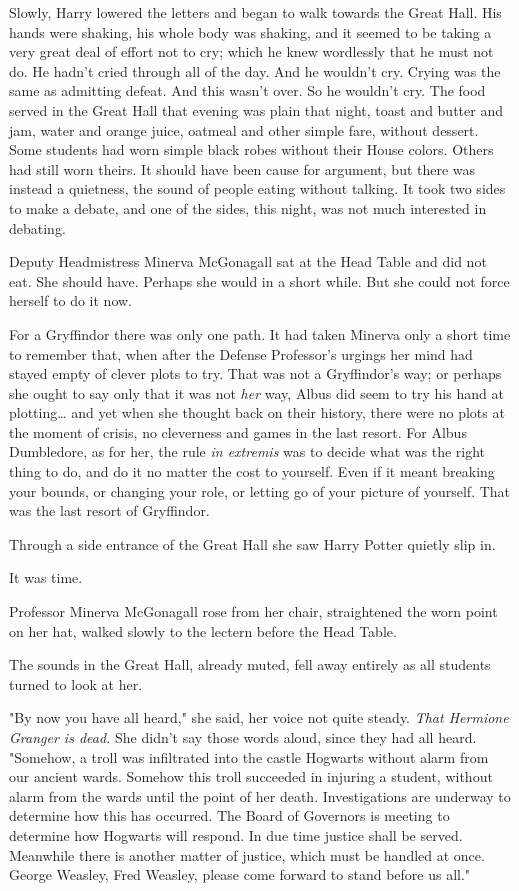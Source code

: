 Slowly, Harry lowered the letters and began to walk towards the Great Hall. His 
hands were shaking, his whole body was shaking, and it seemed to be taking a 
very great deal of effort not to cry; which he knew wordlessly that he must not 
do. He hadn't cried through all of the day. And he wouldn't cry. Crying was the 
same as admitting defeat. And this wasn't over. So he wouldn't cry.
\sbreak
The food served in the Great Hall that evening was plain that night, toast and 
butter and jam, water and orange juice, oatmeal and other simple fare, without 
dessert. Some students had worn simple black robes without their House colors. 
Others had still worn theirs. It should have been cause for argument, but there 
was instead a quietness, the sound of people eating without talking. It took 
two sides to make a debate, and one of the sides, this night, was not much 
interested in debating.

Deputy Headmistress Minerva McGonagall sat at the Head Table and did not eat. 
She should have. Perhaps she would in a short while. But she could not force 
herself to do it now.

For a Gryffindor there was only one path. It had taken Minerva only a short 
time to remember that, when after the Defense Professor's urgings her mind had 
stayed empty of clever plots to try. That was not a Gryffindor's way; or 
perhaps she ought to say only that it was not \emph{her} way, Albus did seem to 
try his hand at plotting{\ldots} and yet when she thought back on their 
history, there were no plots at the moment of crisis, no cleverness and games 
in the last resort. For Albus Dumbledore, as for her, the rule \emph{in 
extremis} was to decide what was the right thing to do, and do it no matter the 
cost to yourself. Even if it meant breaking your bounds, or changing your role, 
or letting go of your picture of yourself. That was the last resort of 
Gryffindor.

Through a side entrance of the Great Hall she saw Harry Potter quietly slip in.

It was time.

Professor Minerva McGonagall rose from her chair, straightened the worn point 
on her hat, walked slowly to the lectern before the Head Table.

The sounds in the Great Hall, already muted, fell away entirely as all students 
turned to look at her.

"By now you have all heard," she said, her voice not quite steady. \emph{That 
Hermione Granger is dead.} She didn't say those words aloud, since they had all 
heard. "Somehow, a troll was infiltrated into the castle Hogwarts without alarm 
from our ancient wards. Somehow this troll succeeded in injuring a student, 
without alarm from the wards until the point of her death. Investigations are 
underway to determine how this has occurred. The Board of Governors is meeting 
to determine how Hogwarts will respond. In due time justice shall be served. 
Meanwhile there is another matter of justice, which must be handled at once. 
George Weasley, Fred Weasley, please come forward to stand before us all."

